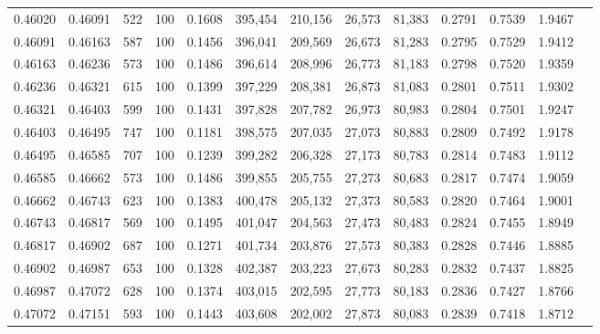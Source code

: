 \begin{tabular}{rrrrrrrrrrrrr}
0.46020 & 0.46091 &   522 & 100 &                                     0.1608 & 395,454 & 210,156 &  26,573 &  81,383 & 0.2791 & 0.7539 & 1.9467 \\
0.46091 & 0.46163 &   587 & 100 &                                     0.1456 & 396,041 & 209,569 &  26,673 &  81,283 & 0.2795 & 0.7529 & 1.9412 \\
0.46163 & 0.46236 &   573 & 100 &                                     0.1486 & 396,614 & 208,996 &  26,773 &  81,183 & 0.2798 & 0.7520 & 1.9359 \\
0.46236 & 0.46321 &   615 & 100 &                                     0.1399 & 397,229 & 208,381 &  26,873 &  81,083 & 0.2801 & 0.7511 & 1.9302 \\
0.46321 & 0.46403 &   599 & 100 &                                     0.1431 & 397,828 & 207,782 &  26,973 &  80,983 & 0.2804 & 0.7501 & 1.9247 \\
0.46403 & 0.46495 &   747 & 100 &                                     0.1181 & 398,575 & 207,035 &  27,073 &  80,883 & 0.2809 & 0.7492 & 1.9178 \\
0.46495 & 0.46585 &   707 & 100 &                                     0.1239 & 399,282 & 206,328 &  27,173 &  80,783 & 0.2814 & 0.7483 & 1.9112 \\
0.46585 & 0.46662 &   573 & 100 &                                     0.1486 & 399,855 & 205,755 &  27,273 &  80,683 & 0.2817 & 0.7474 & 1.9059 \\
0.46662 & 0.46743 &   623 & 100 &                                     0.1383 & 400,478 & 205,132 &  27,373 &  80,583 & 0.2820 & 0.7464 & 1.9001 \\
0.46743 & 0.46817 &   569 & 100 &                                     0.1495 & 401,047 & 204,563 &  27,473 &  80,483 & 0.2824 & 0.7455 & 1.8949 \\
0.46817 & 0.46902 &   687 & 100 &                                     0.1271 & 401,734 & 203,876 &  27,573 &  80,383 & 0.2828 & 0.7446 & 1.8885 \\
0.46902 & 0.46987 &   653 & 100 &                                     0.1328 & 402,387 & 203,223 &  27,673 &  80,283 & 0.2832 & 0.7437 & 1.8825 \\
0.46987 & 0.47072 &   628 & 100 &                                     0.1374 & 403,015 & 202,595 &  27,773 &  80,183 & 0.2836 & 0.7427 & 1.8766 \\
0.47072 & 0.47151 &   593 & 100 &                                     0.1443 & 403,608 & 202,002 &  27,873 &  80,083 & 0.2839 & 0.7418 & 1.8712 \\

\end{tabular}
